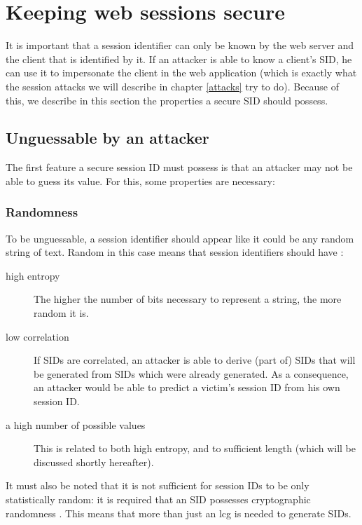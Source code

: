 \section{Keeping web sessions secure}\label{secure-sessions}

It is important that a session identifier can only be known by the web server and the client that is identified by it. If an attacker is able to know a client's SID, he can use it to impersonate the client in the web application (which is exactly what the session attacks we will describe in chapter \ref{attacks} try to do). Because of this, we describe in this section the properties a secure SID should possess.

\subsection{Unguessable by an attacker}

The first feature a secure session ID must possess is that an attacker may not be able to guess its value. For this, some properties are necessary:

\subsubsection{Randomness}
To be unguessable, a session identifier should appear like it could be any random string of text. Random in this case means that session identifiers should have \cite{Nikiforakis2010, Farrell2011, rfc4086}:
\begin{description}
	\item[high entropy] The higher the number of bits necessary to represent a string, the more random it is.
	\item[low correlation] If SIDs are correlated, an attacker is able to derive (part of) SIDs that will be generated from SIDs which were already generated. As a consequence, an attacker would be able to predict a victim's session ID from his own session ID.
	\item[a high number of possible values] This is related to both high entropy, and to sufficient length (which will be discussed shortly hereafter).
\end{description}
It must also be noted that it is not sufficient for session IDs to be only statistically random: it is required that an SID possesses cryptographic randomness \cite{Fu2001}. This means that more than just an \gls{lcg} %
is needed to generate SIDs.

